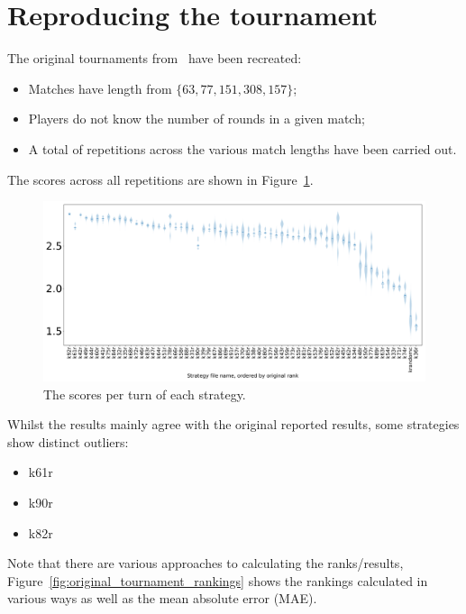 \documentclass{article}
\begin{document}
\section{Reproducing the tournament}\label{sec:reproducing}

The original tournaments from~\cite{Axelrod1980b} have been recreated:

\begin{itemize}
    \item Matches have length from \(\{63, 77, 151, 308, 157\}\);
    \item Players do not know the number of rounds in a given match;
    \item A total of repetitions
        across the various match lengths have been carried out.
\end{itemize}

The scores across all repetitions are shown in
Figure~\ref{fig:original_tournament_scores}.

\begin{figure}[!hbtp]
    \centering
    \includegraphics[width=.8\textwidth]{assets/original_scores_boxplots.pdf}
    \caption{The scores per turn of each strategy.}
    \label{fig:original_tournament_scores}
\end{figure}

Whilst the results mainly agree with the original reported results, some
strategies show distinct outliers:

\begin{itemize}
    \item k61r
    \item k90r
    \item k82r
\end{itemize}

Note that there are various approaches to calculating the ranks/results,
Figure~\ref{fig:original_tournament_rankings} shows the rankings calculated in
various ways as well as the mean absolute error (MAE).
\end{document}
